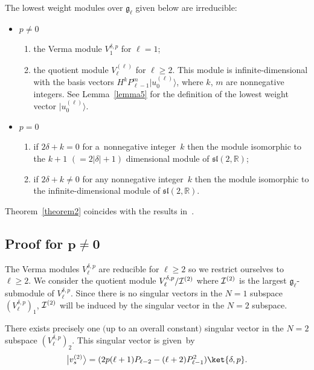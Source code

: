 \documentclass[pdftex]{sigma}
\numberwithin{equation}{section}
\begin{document}
\begin{theorem}
\label{theorem2}
The lowest weight modules over ${\mathfrak g}_{\ell}$ given below are irreducible:
\begin{itemize}\itemsep=0pt
\item $ p \neq 0 $
\begin{enumerate}\itemsep=0pt
\item[$i)$] the Verma module $ V^{\delta,p}_1 $ for $ \ell = 1$;
\item[$ii)$] the quotient module $ V_{\ell}^{(\ell)} $ for $ \ell \geq 2$.
This module is infinite-dimensional with the basis vectors $ H^k P_{\ell-1}^m \big|u_0^{(\ell)}\big\rangle $, where $ k$, $m $ are
nonnegative integers.
See Lemma~{\rm \ref{lemma5}} for the definition of the lowest weight vector $ \big| u_0^{(\ell)}\big\rangle$.
\end{enumerate}
\item $ p = 0 $
\begin{enumerate}\itemsep=0pt
\item[$i)$] if $ 2\delta +k = 0 $ for a~nonnegative integer~$k$ then the module isomorphic to the $ k+1$ $(= 2|\delta|+1)$
dimensional module of $ {\mathfrak{sl}}(2,{\mathbb R})$;
\item[$ii)$] if $ 2\delta +k \neq 0 $ for any nonnegative integer~$k$ then the module isomorphic to the infinite-dimensional
module of $ {\mathfrak{sl}}(2,{\mathbb R})$.
\end{enumerate}
\end{itemize}
\end{theorem}

Theorem~\ref{theorem2} coincides with the results in~\cite{LuMazoZhao}.

\subsection[Proof for $p \neq 0$]{Proof for $\boldsymbol{p \neq 0}$}
\label{PFqn0}

The Verma modules $ V^{\delta,p}_{\ell} $ are reducible for $ \ell \geq 2 $ so we restrict ourselves to $ \ell \geq 2$.
We consider the quotient module $ V^{\delta,p}_{\ell}/{\cal I}^{(2)} $ where $ {\cal I}^{(2)} $ is the largest
${\mathfrak g}_{\ell}$-submodule of $ V^{\delta,p}_{\ell}$.
Since there is no singular vectors in the $ N = 1 $ subspace $ (V^{\delta,p}_{\ell})_1$, $ {\cal I}^{(2)} $ will be
induced by the singular vector in the $ N = 2 $ subspace.
\begin{lemma}
\label{lemma3}
There exists precisely one $($up to an overall constant$)$ singular vector in the $ N = 2 $ subspace $
(V^{\delta,p}_{\ell})_2$.
This singular vector is given~by
\begin{gather*}
\big|v_s^{(2)}\big\rangle = (2p (\ell+1) P_{\ell-2} - (\ell+2) P_{\ell-1}^2) \ket{\delta,p}.
\end{gather*}
\end{lemma}
\end{document}
